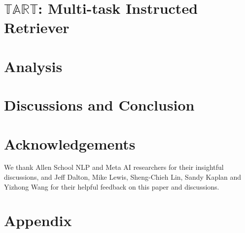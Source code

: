 \documentclass[11pt]{article}
\newcommand{\model}{$\mathbb{TART}$\xspace}
\begin{document}
\section{\model: Multi-task Instructed Retriever}



\section{Analysis}

\section{Discussions and Conclusion}


\section*{Acknowledgements}
We thank  Allen School NLP and Meta AI researchers for their insightful discussions, and Jeff Dalton, Mike Lewis, Sheng-Chieh Lin, Sandy Kaplan and Yizhong Wang for their helpful feedback on this paper and discussions. 


\newpage
\clearpage
\appendix

\section*{Appendix}
\label{sec:appendix}

\end{document}
